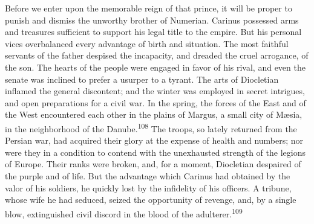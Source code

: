 



Before we enter upon the memorable reign of that prince, it will
be proper to punish and dismiss the unworthy brother of Numerian.
Carinus possessed arms and treasures sufficient to support his
legal title to the empire. But his personal vices overbalanced
every advantage of birth and situation. The most faithful
servants of the father despised the incapacity, and dreaded the
cruel arrogance, of the son. The hearts of the people were
engaged in favor of his rival, and even the senate was inclined
to prefer a usurper to a tyrant. The arts of Diocletian inflamed
the general discontent; and the winter was employed in secret
intrigues, and open preparations for a civil war. In the spring,
the forces of the East and of the West encountered each other in
the plains of Margus, a small city of Mæsia, in the neighborhood
of the Danube.\textsuperscript{108} The troops, so lately returned from the
Persian war, had acquired their glory at the expense of health
and numbers; nor were they in a condition to contend with the
unexhausted strength of the legions of Europe. Their ranks were
broken, and, for a moment, Diocletian despaired of the purple and
of life. But the advantage which Carinus had obtained by the
valor of his soldiers, he quickly lost by the infidelity of his
officers. A tribune, whose wife he had seduced, seized the
opportunity of revenge, and, by a single blow, extinguished civil
discord in the blood of the adulterer.\textsuperscript{109}



